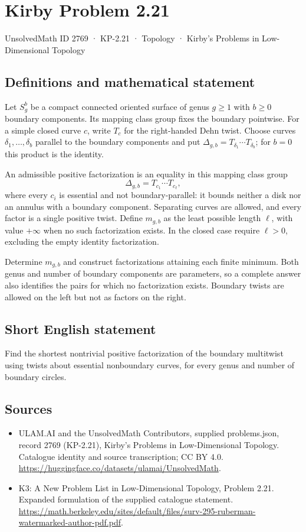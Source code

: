 \documentclass[11pt,a4paper]{article}
\begin{document}
\section*{Kirby Problem 2.21}\label{2769}
{\small UnsolvedMath ID 2769 · KP-2.21 · Topology · Kirby's Problems in Low-Dimensional Topology}
\subsection{Definitions and mathematical statement}
Let $S_g^b$ be a compact connected oriented surface of genus $g\geq1$ with
$b\geq0$ boundary components. Its mapping class group fixes the boundary
pointwise. For a simple closed curve $c$, write $T_c$ for the right-handed
Dehn twist. Choose curves $\delta_1,\ldots,\delta_b$ parallel to the boundary
components and put $\Delta_{g,b}=T_{\delta_1}\cdots T_{\delta_b}$; for $b=0$
this product is the identity.

An admissible positive factorization is an equality in this mapping class group
\[
 \Delta_{g,b}=T_{c_1}\cdots T_{c_\ell},
\]
where every $c_i$ is essential and not boundary-parallel: it bounds neither a
disk nor an annulus with a boundary component. Separating curves are allowed,
and every factor is a single positive twist. Define $m_{g,b}$ as the least
possible length $\ell$, with value $+\infty$ when no such factorization exists.
In the closed case require $\ell>0$, excluding the empty identity factorization.

Determine $m_{g,b}$ and construct factorizations attaining each finite minimum.
Both genus and number of boundary components are parameters, so a complete
answer also identifies the pairs for which no factorization exists. Boundary
twists are allowed on the left but not as factors on the right.
\subsection{Short English statement}
Find the shortest nontrivial positive factorization of the boundary multitwist using twists about essential nonboundary curves, for every genus and number of boundary circles.
\subsection{Sources}
\begin{itemize}
\item[S1] ULAM.AI and the UnsolvedMath Contributors, supplied problems.json, record 2769 (KP-2.21), Kirby's Problems in Low-Dimensional Topology. Catalogue identity and source transcription; CC BY 4.0.
\url{https://huggingface.co/datasets/ulamai/UnsolvedMath}.
\item[S2] K3: A New Problem List in Low-Dimensional Topology, Problem 2.21. Expanded formulation of the supplied catalogue statement.
\url{https://math.berkeley.edu/sites/default/files/surv-295-ruberman-watermarked-author-pdf.pdf}.
\end{itemize}
\end{document}
